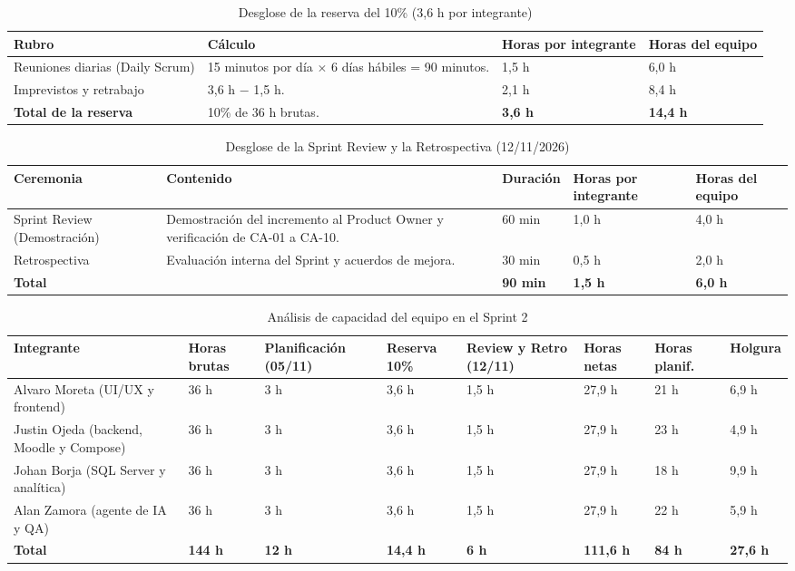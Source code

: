 \documentclass[11pt,a4paper]{article}
\newcommand{\hd}[1]{\textbf{#1}}
\begin{document}
\begin{table}[H]
\centering\small
\caption{Desglose de la reserva del 10\% (3,6 h por integrante)}
\label{tab:reserva}
\begin{tabularx}{\textwidth}{|R{4.2cm}|Y|R{2.4cm}|R{2.2cm}|}
\hline
\hd{Rubro} & \hd{Cálculo} & \hd{Horas por integrante} & \hd{Horas del equipo}\\ \hline
Reuniones diarias (Daily Scrum) & 15 minutos por día $\times$ 6 días hábiles = 90 minutos. & 1,5 h & 6,0 h\\ \hline
Imprevistos y retrabajo & 3,6 h $-$ 1,5 h. & 2,1 h & 8,4 h\\ \hline
\textbf{Total de la reserva} & 10\% de 36 h brutas. & \textbf{3,6 h} & \textbf{14,4 h}\\ \hline
\end{tabularx}
\end{table}

\begin{table}[H]
\centering\small
\caption{Desglose de la Sprint Review y la Retrospectiva (12/11/2026)}
\label{tab:review}
\begin{tabularx}{\textwidth}{|R{4.4cm}|Y|R{1.8cm}|R{2.0cm}|R{1.6cm}|}
\hline
\hd{Ceremonia} & \hd{Contenido} & \hd{Duración} & \hd{Horas por integrante} & \hd{Horas del equipo}\\ \hline
Sprint Review (Demostración) & Demostración del incremento al Product Owner y verificación de CA-01 a CA-10. & 60 min & 1,0 h & 4,0 h\\ \hline
Retrospectiva & Evaluación interna del Sprint y acuerdos de mejora. & 30 min & 0,5 h & 2,0 h\\ \hline
\textbf{Total} & & \textbf{90 min} & \textbf{1,5 h} & \textbf{6,0 h}\\ \hline
\end{tabularx}
\end{table}

\begin{table}[H]
\centering\footnotesize
\caption{Análisis de capacidad del equipo en el Sprint 2}
\begin{tabularx}{\textwidth}{|Y|R{1.3cm}|R{1.7cm}|R{1.4cm}|R{1.7cm}|R{1.3cm}|R{1.4cm}|R{1.2cm}|}
\hline
\hd{Integrante} & \hd{Horas brutas} & \hd{Planificación (05/11)} & \hd{Reserva 10\%} & \hd{Review y Retro (12/11)} & \hd{Horas netas} & \hd{Horas planif.} & \hd{Holgura}\\ \hline
Alvaro Moreta (UI/UX y frontend) & 36 h & 3 h & 3,6 h & 1,5 h & 27,9 h & 21 h & 6,9 h\\ \hline
Justin Ojeda (backend, Moodle y Compose) & 36 h & 3 h & 3,6 h & 1,5 h & 27,9 h & 23 h & 4,9 h\\ \hline
Johan Borja (SQL Server y analítica) & 36 h & 3 h & 3,6 h & 1,5 h & 27,9 h & 18 h & 9,9 h\\ \hline
Alan Zamora (agente de IA y QA) & 36 h & 3 h & 3,6 h & 1,5 h & 27,9 h & 22 h & 5,9 h\\ \hline
\textbf{Total} & \textbf{144 h} & \textbf{12 h} & \textbf{14,4 h} & \textbf{6 h} & \textbf{111,6 h} & \textbf{84 h} & \textbf{27,6 h}\\ \hline
\end{tabularx}
\end{table}
\end{document}
